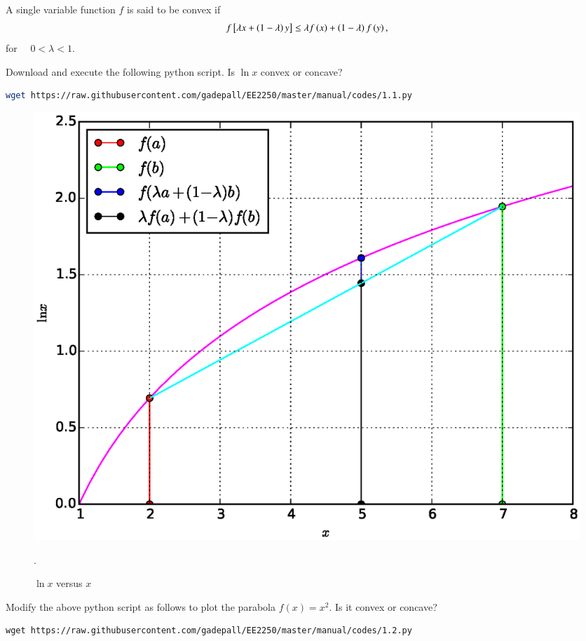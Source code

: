 \documentclass[journal,12pt,twocolumn]{IEEEtran}
\begin{document}
A single variable function $f$ is said to be convex if
%
\begin{align}
\label{ch1_convex_def}
f{}\left[\lambda x + \left(1-\lambda\right)y\right] \leq \lambda f\left(x\right) + \left(1-\lambda\right)f\left(y\right), 
\end{align}
%
for $\quad 0 < \lambda < 1$.
\begin{problem}
Download and execute the following python script. Is  $\ln x$ convex or  concave?
\end{problem}
%
\begin{lstlisting}[language=sh]
wget https://raw.githubusercontent.com/gadepall/EE2250/master/manual/codes/1.1.py
\end{lstlisting}
%
\begin{figure}[h]
\centering
\includegraphics[width=\columnwidth]{./figs/1.1.eps}
\caption{ $\ln x$ versus $x$}.
\label{fig.1.1}	
\end{figure}
%
\begin{problem}
Modify the above python script as follows to plot the parabola $f(x) = x^2$. Is it convex or concave?
\end{problem}
\begin{lstlisting}
wget https://raw.githubusercontent.com/gadepall/EE2250/master/manual/codes/1.2.py
\end{lstlisting}
%
\end{document}
